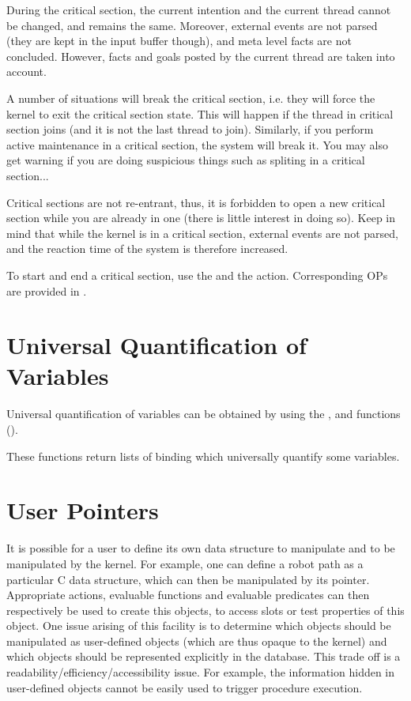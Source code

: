 During the critical section, the current intention and the current thread
cannot be changed, and remains the same. Moreover, external events are not
parsed (they are kept in the input buffer though), and meta level facts are not
concluded. However, facts and goals posted by the current thread are taken into
account.

A number of situations will break the critical section, i.e. they will force the
kernel to exit the critical section state. This will happen if the thread in
critical section joins (and it is not the last thread to join). Similarly, if
you perform active maintenance in a critical section, the system will break it.
You may also get warning if you are doing suspicious things such as spliting in
a critical section...

Critical sections are not re-entrant, thus, it is forbidden to open a new
critical section while you are already in one (there is little interest in
doing so). Keep in mind that while the kernel is in a critical section,
external events are not parsed, and the reaction time of the system is
therefore increased.

To start and end a critical section, use the  and
the  action. Corresponding OPs are provided in
.

\section{Universal Quantification of Variables}

Universal quantification of variables can be obtained by using the ,
 and  functions ().

These functions return lists of binding which universally quantify some variables.

\section{User Pointers}

It is possible for a user to define its own data structure to manipulate and to
be manipulated by the kernel. For example, one can define a robot path as a
particular C data structure, which can then be manipulated by its pointer.
Appropriate actions, evaluable functions and evaluable predicates can then
respectively be used to create this objects, to access slots or test properties
of this object. One issue arising of this facility is to determine which
objects should be manipulated as user-defined objects (which are thus opaque to
the kernel) and which objects should be represented explicitly in the database.
This trade off is a readability/efficiency/accessibility issue. For example,
the information hidden in user-defined objects cannot be easily used to trigger
procedure execution.

